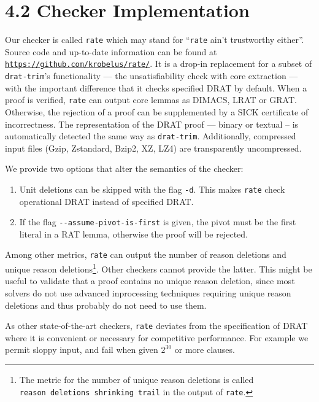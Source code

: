 \documentclass[
]{report}
\begin{document}
\hypertarget{checker-implementation}{%
\section{4.2 Checker Implementation}\label{checker-implementation}}

Our checker is called \texttt{rate} which may stand for ``\texttt{rate}
ain't trustworthy either''. Source code and up-to-date information can
be found at
\href{https://github.com/krobelus/rate/}{\texttt{https://github.com/krobelus/rate/}}.
It is a drop-in replacement for a subset of \texttt{drat-trim}'s
functionality --- the unsatisfiability check with core extraction ---
with the important difference that it checks specified DRAT by default.
When a proof is verified, \texttt{rate} can output core lemmas as
DIMACS, LRAT or GRAT. Otherwise, the rejection of a proof can be
supplemented by a SICK certificate of incorrectness. The representation
of the DRAT proof --- binary or textual -- is automatically detected the
same way as \texttt{drat-trim}. Additionally, compressed input files
(Gzip, Zstandard, Bzip2, XZ, LZ4) are transparently uncompressed.

We provide two options that alter the semantics of the checker:

\begin{enumerate}
\def\labelenumi{\arabic{enumi}.}
\item
  Unit deletions can be skipped with the flag \texttt{-d}. This makes
  \texttt{rate} check operational DRAT instead of specified DRAT.
\item
  If the flag \texttt{-\/-assume-pivot-is-first} is given, the pivot
  must be the first literal in a RAT lemma, otherwise the proof will be
  rejected.
\end{enumerate}

Among other metrics, \texttt{rate} can output the number of reason
deletions and unique reason deletions\footnote{The metric for the number
  of unique reason deletions is called
  \texttt{reason\ deletions\ shrinking\ trail} in the output of
  \texttt{rate}.}. Other checkers cannot provide the latter. This might
be useful to validate that a proof contains no unique reason deletion,
since most solvers do not use advanced inprocessing techniques requiring
unique reason deletions and thus probably do not need to use them.

As other state-of-the-art checkers, \texttt{rate} deviates from the
specification of DRAT where it is convenient or necessary for
competitive performance. For example we permit sloppy input, and fail
when given \(2^{30}\) or more clauses.
\end{document}
